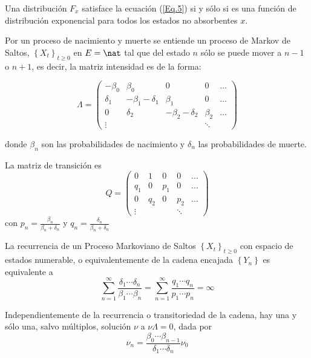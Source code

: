 \begin{Note}
Una distribuci\'on $F_{x}$ satisface la ecuaci\'on (\ref{Eq.5}) si y s\'olo si es una funci\'on de distribuci\'on exponencial para todos los estados no absorbentes $x$.
\end{Note}

Por un proceso de nacimiento y muerte se entiende un proceso de Markov de Saltos, $\left\{X_{t}\right\}_{t\geq0}$ en $E=\nat$ tal que del estado $n$ s\'olo se puede mover a $n-1$ o $n+1$, es decir, la matriz intensidad es de la forma:

\begin{equation}
\Lambda=\left(\begin{array}{ccccc}
-\beta_{0}&\beta_{0} & 0 & 0 & \ldots\\
\delta_{1}&-\beta_{1}-\delta_{1} & \beta_{1}&0&\ldots\\
0&\delta_{2}&-\beta_{2}-\delta_{2} & \beta_{2}&\ldots\\
\vdots & & & \ddots &
\end{array}\right)
\end{equation}

donde $\beta_{n}$ son las probabilidades de nacimiento y
$\delta_{n}$ las probabilidades de muerte.

La matriz de transici\'on es
\begin{equation}
Q=\left(\begin{array}{ccccc}
0& 1 & 0 & 0 & \ldots\\
q_{1}&0 & p_{1}&0&\ldots\\
0&q_{2}&0& p_{2}&\ldots\\
\vdots & & & \ddots &
\end{array}\right)
\end{equation}
con $p_{n}=\frac{\beta_{n}}{\beta_{n}+\delta_{n}}$ y
$q_{n}=\frac{\delta_{n}}{\beta_{n}+\delta_{n}}$

\begin{Prop}
La recurrencia de un Proceso Markoviano de Saltos
$\left\{X_{t}\right\}_{t\geq0}$ con espacio de estados numerable, o equivalentemente de la cadena encajada $\left\{Y_{n}\right\}$ es equivalente a
\begin{equation}\label{Eq.2.1}
\sum_{n=1}^{\infty}\frac{\delta_{1}\cdots\delta_{n}}{\beta_{1}\cdots\beta_{n}}=\sum_{n=1}^{\infty}\frac{q_{1}\cdots
q_{n}}{p_{1}\cdots p_{n}}=\infty
\end{equation}
\end{Prop}

\begin{Lem}
Independientemente de la recurrencia o transitoriedad de la cadena, hay una y s\'olo una, salvo m\'ultiplos, soluci\'on $\nu$
a $\nu\Lambda=0$, dada por
\begin{equation}\label{Eq.2.2}
\nu_{n}=\frac{\beta_{0}\cdots\beta_{n-1}}{\delta_{1}\cdots\delta_{n}}\nu_{0}
\end{equation}
\end{Lem}

